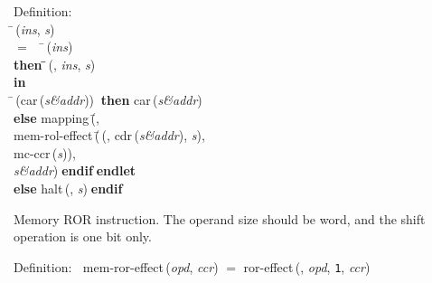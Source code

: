 \begin{tabbing}{\sc Definition}: \\  
\=\,({\it{ins\/}}, {\it{s\/}}) \\ 
$=$$\;\;\;\;$\=\,({\it{ins\/}}) \\ 
{\bf then }\=\=\,({}, {\it{ins\/}}, {\it{s\/}})\- \\ 
{\bf in} \\ 
\=\,({\rm{car}}\,({\it{s\&addr\/}}))$\;\;${\bf then }{\rm{car}}\,({\it{s\&addr\/}}) \\ 
{\bf else }{\rm{mapping}}\,(\=, \\ 
{\rm{mem-rol-effect}}\,(\=\,({}, {\rm{cdr}}\,({\it{s\&addr\/}}), {\it{s\/}}), \\ 
{\rm{mc-ccr}}\,({\it{s\/}}))\-, \\ 
{\it{s\&addr\/}})\-$\;${\bf  endif}\-$\;${\bf  endlet}\- \\ 
{\bf else }{\rm{halt}}\,({}, {\it{s\/}})$\;${\bf  endif}\-\-
\end{tabbing}

 Memory ROR instruction.
 The operand size should be word, and the shift operation is one bit only.
\begin{tabbing}{\sc Definition}:$\;\;$
{\rm{mem-ror-effect}}\,({\it{opd\/}}, {\it{ccr\/}}) $=$ {\rm{ror-effect}}\,({}, {\it{opd\/}}, {\tt{1}}, {\it{ccr\/}})
\end{tabbing}

